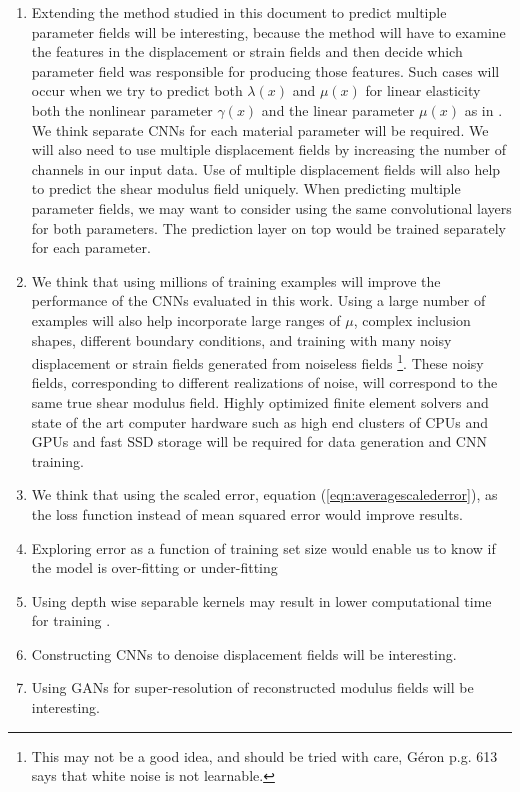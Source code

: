 \documentclass[12pt]{article}
\begin{document}
\begin{enumerate}
\item{Extending the method studied in this document to predict multiple parameter fields will be interesting, because the method will have to examine the features in the displacement or strain fields and then decide which parameter field was responsible for producing those features. Such cases will occur when we try to predict both $\lambda(x)$ and $\mu(x)$ for linear elasticity both the nonlinear parameter $\gamma(x)$ and the linear parameter $\mu(x)$ as in \cite{paper:gokhale2008}. We think separate CNNs for each material parameter will be required. We will also need to use multiple displacement fields \cite{paper:barbonegokhale,paper:barbonebamber} by increasing the number of channels in our input data. Use of multiple displacement fields will also help to predict the shear modulus field uniquely. When predicting multiple parameter fields, we may want to consider using the same convolutional layers for both parameters. The prediction layer on top would be trained separately for each parameter.}
\item{We think that using millions of training examples will improve the performance of the CNNs evaluated in this work. Using a large number of examples will also help incorporate large ranges of $\mu$, complex inclusion shapes, different boundary conditions, and training with many noisy displacement or strain fields generated from noiseless fields \footnote{This may not be a good idea, and should be tried with care, G\'{e}ron \cite{book:geron2019} p.g. 613 says that white noise is not learnable.}. These noisy fields, corresponding to different realizations of noise, will correspond to the same true shear modulus field. Highly optimized finite element solvers and state of the art computer hardware such as high end clusters of CPUs and GPUs and fast SSD storage will be required for data generation and CNN training.}
\item{We think that using the scaled error, equation (\ref{eqn:averagescalederror}), as the loss function instead of mean squared error would improve results.}
\item{Exploring error as a function of training set size would enable us to know if the model is over-fitting or under-fitting}
\item{Using depth wise separable kernels may result in lower computational time for training \cite{misc:sepconv}.}
\item{Constructing CNNs to denoise displacement fields will be interesting.}
\item{Using GANs for super-resolution of reconstructed modulus fields will be interesting.}
\end{enumerate}
\end{document}
